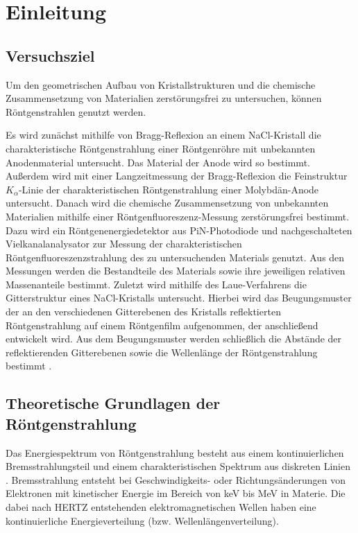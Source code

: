 \chapter{Einleitung}

\section{Versuchsziel}

Um den geometrischen Aufbau von Kristallstrukturen und die chemische Zusammensetzung von Materialien zerstörungsfrei zu untersuchen, können Röntgenstrahlen genutzt werden.

Es wird zunächst mithilfe von Bragg-Reflexion an einem NaCl-Kristall die charakteristische Röntgenstrahlung einer Röntgenröhre mit unbekannten Anodenmaterial untersucht. Das Material der Anode wird so bestimmt. Außerdem wird mit einer Langzeitmessung der Bragg-Reflexion die Feinstruktur $K_\alpha$-Linie der charakteristischen Röntgenstrahlung einer Molybdän-Anode untersucht.
Danach wird die chemische Zusammensetzung von unbekannten Materialien mithilfe einer Röntgenfluoreszenz-Messung zerstörungsfrei bestimmt. Dazu wird ein Röntgenenergiedetektor aus PiN-Photodiode und nachgeschalteten Vielkanalanalysator zur Messung der charakteristischen Röntgenfluoreszenzstrahlung des zu untersuchenden Materials genutzt. Aus den Messungen werden die Bestandteile des Materials sowie ihre jeweiligen relativen Massenanteile bestimmt.
Zuletzt wird mithilfe des Laue-Verfahrens die Gitterstruktur eines NaCl-Kristalls untersucht. Hierbei wird das Beugungsmuster der an den verschiedenen Gitterebenen des Kristalls reflektierten Röntgenstrahlung auf einem Röntgenfilm aufgenommen, der anschließend entwickelt wird. Aus dem Beugungsmuster werden schließlich die Abstände der reflektierenden Gitterebenen sowie die Wellenlänge der Röntgenstrahlung bestimmt \cite[1-2]{Versuchsanleitung428}.


\section{Theoretische Grundlagen der Röntgenstrahlung}

Das Energiespektrum von Röntgenstrahlung besteht aus einem kontinuierlichen Bremsstrahlungsteil und einem charakteristischen Spektrum aus diskreten Linien \cite[254]{Demtroeder3}.
Bremsstrahlung entsteht bei Geschwindigkeits- oder Richtungsänderungen von Elektronen mit kinetischer Energie im Bereich von keV bis MeV in Materie. Die dabei nach \uppercase{Hertz} entstehenden elektromagnetischen Wellen haben eine kontinuierliche Energieverteilung (bzw. Wellenlängenverteilung).

